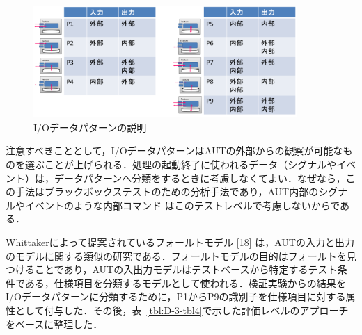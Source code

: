 \documentclass[a4paper,12pt]{jreport}
\begin{document}
    \begin{figure}[h]
  \begin{center}
  \includegraphics[width=10cm]{./image/D-3-Fig5.png}
  \caption{I/Oデータパターンの説明}
  \label{fig:D-3-Fig5}
  \end{center}
   \end{figure}

注意すべきこととして，I/OデータパターンはAUTの外部からの観察が可能なものを選ぶことが上げられる．処理の起動終了に使われるデータ（シグナルやイベント）は，データパターンへ分類をするときに考慮しなくてよい．なぜなら，この手法はブラックボックステストのための分析手法であり，AUT内部のシグナルやイベントのような内部コマンド はこのテストレベルで考慮しないからである．

  Whittakerによって提案されているフォールトモデル [18] は，AUTの入力と出力のモデルに関する類似の研究である．フォールトモデルの目的はフォールトを見つけることであり，AUTの入出力モデルはテストベースから特定するテスト条件である，仕様項目を分類するモデルとして使われる．検証実験からの結果をI/Oデータパターンに分類するために，P1からP9の識別子を仕様項目に対する属性として付与した．その後，表~\ref{tbl:D-3-tbl4}で示した評価レベルのアプローチをベースに整理した．
\end{document}
